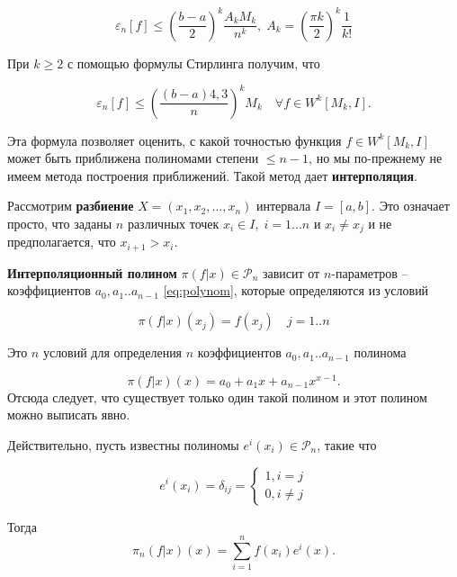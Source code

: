 \begin{equation}
\varepsilon_n[f] \leq \left(\frac{b-a}{2}\right)^k \frac{A_k M_k}{n^k},\; A_k = \left(\frac{\pi k}{2}\right) ^k \frac{1}{k!}
\end{equation}

При $k \geq 2$ с помощью формулы Стирлинга получим, что 

\begin{equation}
\varepsilon_n[f] \leq \left(\frac{(b-a)4,3}{n}\right)^k M_k \quad \forall f \in W^k[M_k, I].
\end{equation}

Эта формула позволяет оценить, с какой точностью функция $f \in W^k[M_k, I]$ может быть приближена полиномами степени $\leq n-1$, но мы по-прежнему не имеем метода построения приближений.
Такой метод дает \textbf{интерполяция}.

Рассмотрим \textbf{разбиение} $X = (x_1, x_2,..., x_n)$ интервала $I = [a, b]$. Это означает просто, что заданы $n$ различных точек $x_i \in I, \; i = 1 ... n$ и $x_i \neq x_j$ и не предполагается, что $x_{i+1} > x_i$.

\textbf{Интерполяционный полином} $\pi(f|x) \in \mathscr{P}_n $ зависит от $n$-параметров -- коэффициентов $a_0, a_1 .. a_{n-1}$ \ref{eq:polynom}, которые определяются из условий

\begin{equation}\label{eq:interpolation}
\pi(f|x)(x_j) = f(x_j) \quad j = 1 .. n
\end{equation}

Это $n$ условий для определения $n$ коэффициентов  $a_0, a_1 .. a_{n-1}$ полинома

\begin{equation}
\pi(f|x)(x) = a_0 + a_1x + a_{n-1}x^{x-1}.
\end{equation}
Отсюда следует, что существует только один такой полином и этот полином можно выписать явно. 

Действительно, пусть известны полиномы $e^i(x_i) \in \mathscr{P}_n $, такие что

\begin{equation}
e^i(x_i)= \delta_{ij} =
\begin{cases}
1, i = j \\
0, i \neq j

\end{cases}
\end{equation}

Тогда 
\begin{equation}
\pi_n(f|x)(x) = \sum_{i = 1}^{n} f(x_i)e^i(x).
\end{equation}

